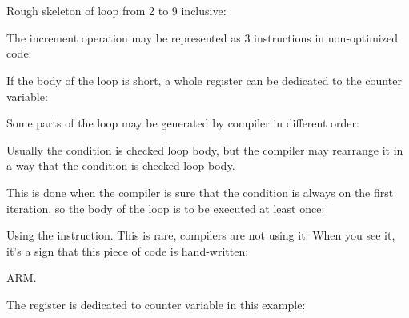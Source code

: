 ﻿\section{\Conclusion{}}

Rough skeleton of loop from 2 to 9 inclusive:



The increment operation may be represented as 3 instructions in non-optimized code:



If the body of the loop is short, a whole register can be dedicated to the counter variable:



Some parts of the loop may be generated by compiler in different order:



Usually the condition is checked  loop body, but the compiler may rearrange it in a way that
the condition is checked  loop body.

This is done when the compiler is sure that the condition is always  on the first iteration, 
so the body of the loop is to be executed at least once:




Using the  instruction. This is rare, compilers are not using it.
When you see it, it's a sign that this piece of code is hand-written:



\ifdefined\IncludeARM
ARM. 

The  register is dedicated to counter variable in this example:


\fi


